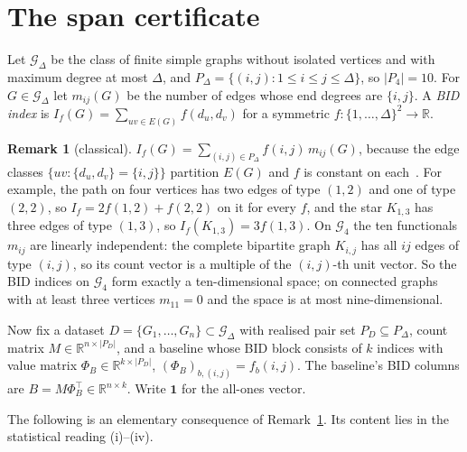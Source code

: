 \documentclass[11pt,a4paper]{article}
\theoremstyle{definition}
\newtheorem{remark}[theorem]{Remark}
\newcommand{\Gc}{\mathcal{G}}
\begin{document}
\section{The span certificate}\label{sec:theory}

Let $\Gc_\Delta$ be the class of finite simple graphs without
isolated vertices and with maximum degree at most $\Delta$, and
$P_\Delta=\{(i,j):1\le i\le j\le\Delta\}$, so $|P_4|=10$. For
$G\in\Gc_\Delta$ let $m_{ij}(G)$ be the number of edges whose end
degrees are $\{i,j\}$. A \emph{BID index} is
$I_f(G)=\sum_{uv\in E(G)} f(d_u,d_v)$ for a symmetric
$f:\{1,\dots,\Delta\}^2\to\mathbb{R}$.

\begin{remark}[classical]\label{rem:linear}
$I_f(G)=\sum_{(i,j)\in P_\Delta} f(i,j)\,m_{ij}(G)$, because the
edge classes $\{uv:\{d_u,d_v\}=\{i,j\}\}$ partition $E(G)$ and $f$ is
constant on each~\cite{Gutman2013Degree,RadaCruz2014VDB}. For example, the path on four vertices has two edges of type $(1,2)$
and one of type $(2,2)$, so $I_f=2f(1,2)+f(2,2)$ on it for every $f$, and the star
$K_{1,3}$ has three edges of type $(1,3)$, so $I_f(K_{1,3})=3f(1,3)$.
On $\Gc_4$ the ten functionals $m_{ij}$ are linearly independent: the complete
bipartite graph $K_{i,j}$ has all $ij$ edges of type $(i,j)$, so its
count vector is a multiple of the $(i,j)$-th unit vector. So the BID
indices on $\Gc_4$ form exactly a ten-dimensional space; on connected
graphs with at least three vertices $m_{11}=0$ and the space is at
most nine-dimensional.
\end{remark}

Now fix a dataset $D=\{G_1,\dots,G_n\}\subset\Gc_\Delta$ with
realised pair set $P_D\subseteq P_\Delta$, count matrix
$M\in\mathbb{R}^{n\times|P_D|}$, and a baseline whose BID block
consists of $k$ indices with value matrix
$\Phi_B\in\mathbb{R}^{k\times|P_D|}$, $(\Phi_B)_{b,(i,j)}=f_b(i,j)$. The
baseline's BID columns are $B=M\Phi_B^{\top}\in\mathbb{R}^{n\times k}$.
Write $\mathbf 1$ for the all-ones vector.

The following is an elementary consequence of Remark~\ref{rem:linear}.
Its content lies in the statistical reading (i)--(iv).
\end{document}
